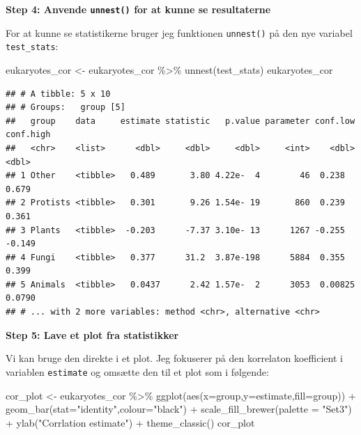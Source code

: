 \documentclass[
]{book}
\newenvironment{Shaded}{\begin{snugshade}}{\end{snugshade}}
\newcommand{\AttributeTok}[1]{\textcolor[rgb]{0.77,0.63,0.00}{#1}}
\newcommand{\FunctionTok}[1]{\textcolor[rgb]{0.00,0.00,0.00}{#1}}
\newcommand{\NormalTok}[1]{#1}
\newcommand{\OtherTok}[1]{\textcolor[rgb]{0.56,0.35,0.01}{#1}}
\newcommand{\SpecialCharTok}[1]{\textcolor[rgb]{0.00,0.00,0.00}{#1}}
\newcommand{\StringTok}[1]{\textcolor[rgb]{0.31,0.60,0.02}{#1}}
\begin{document}
\textbf{Step 4: Anvende \texttt{unnest()} for at kunne se resultaterne}

For at kunne se statistikerne bruger jeg funktionen \texttt{unnest()} på den nye variabel \texttt{test\_stats}:

\begin{Shaded}
\begin{Highlighting}[]
\NormalTok{eukaryotes\_cor }\OtherTok{\textless{}{-}}\NormalTok{ eukaryotes\_cor }\SpecialCharTok{\%\textgreater{}\%}
  \FunctionTok{unnest}\NormalTok{(test\_stats)}
\NormalTok{eukaryotes\_cor}
\end{Highlighting}
\end{Shaded}

\begin{verbatim}
## # A tibble: 5 x 10
## # Groups:   group [5]
##   group    data     estimate statistic   p.value parameter conf.low conf.high
##   <chr>    <list>      <dbl>     <dbl>     <dbl>     <int>    <dbl>     <dbl>
## 1 Other    <tibble>   0.489       3.80 4.22e-  4        46  0.238      0.679 
## 2 Protists <tibble>   0.301       9.26 1.54e- 19       860  0.239      0.361 
## 3 Plants   <tibble>  -0.203      -7.37 3.10e- 13      1267 -0.255     -0.149 
## 4 Fungi    <tibble>   0.377      31.2  3.87e-198      5884  0.355      0.399 
## 5 Animals  <tibble>   0.0437      2.42 1.57e-  2      3053  0.00825    0.0790
## # ... with 2 more variables: method <chr>, alternative <chr>
\end{verbatim}

\textbf{Step 5: Lave et plot fra statistikker}

Vi kan bruge den direkte i et plot. Jeg fokuserer på den korrelaton koefficient i variablen \texttt{estimate} og omsætte den til et plot som i følgende:

\begin{Shaded}
\begin{Highlighting}[]
\NormalTok{cor\_plot }\OtherTok{\textless{}{-}}\NormalTok{ eukaryotes\_cor }\SpecialCharTok{\%\textgreater{}\%}
  \FunctionTok{ggplot}\NormalTok{(}\FunctionTok{aes}\NormalTok{(}\AttributeTok{x=}\NormalTok{group,}\AttributeTok{y=}\NormalTok{estimate,}\AttributeTok{fill=}\NormalTok{group)) }\SpecialCharTok{+} 
  \FunctionTok{geom\_bar}\NormalTok{(}\AttributeTok{stat=}\StringTok{"identity"}\NormalTok{,}\AttributeTok{colour=}\StringTok{"black"}\NormalTok{) }\SpecialCharTok{+}
  \FunctionTok{scale\_fill\_brewer}\NormalTok{(}\AttributeTok{palette =} \StringTok{"Set3"}\NormalTok{) }\SpecialCharTok{+} 
  \FunctionTok{ylab}\NormalTok{(}\StringTok{"Corrlation estimate"}\NormalTok{) }\SpecialCharTok{+}
  \FunctionTok{theme\_classic}\NormalTok{() }
\NormalTok{cor\_plot}
\end{Highlighting}
\end{Shaded}
\end{document}

